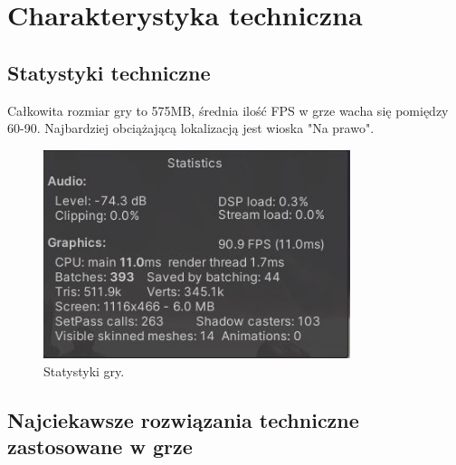 \documentclass[10pt,a4paper]{article}
\begin{document}
\section{Charakterystyka techniczna}
\subsection{Statystyki techniczne}
Całkowita rozmiar gry to 575MB, średnia ilość FPS w grze wacha się pomiędzy 60-90. Najbardziej obciążającą lokalizacją jest wioska "Na prawo". 

\begin{figure}[ht!]
\begin{center}
\includegraphics[width=0.8\textwidth]{pictures/FPS_LOW_LOCATION.jpg}
\end{center}
\caption{Statystyki gry.}
\end{figure}

\subsection{Najciekawsze rozwiązania techniczne zastosowane w grze}
\end{document}
